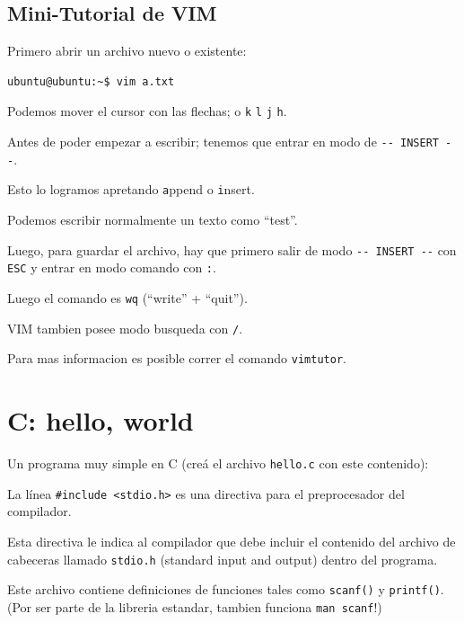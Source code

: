 \documentclass[11pt,a4paper]{article}
\newcommand{\inputcode}[2][]{%
  \par\noindent\begin{minipage}{\linewidth}
    
  \end{minipage}\par}
\begin{document}
\subsection{Mini-Tutorial de VIM}

Primero abrir un archivo nuevo o existente:

\begin{lstlisting}[language=bash]
ubuntu@ubuntu:~$ vim a.txt
\end{lstlisting}

Podemos mover el cursor con las flechas; o \lstinline!k! \lstinline!l! \lstinline!j! \lstinline!h!.

Antes de poder empezar a escribir; tenemos que entrar en modo de \lstinline!-- INSERT --!.

Esto lo logramos apretando \lstinline!a!ppend o \lstinline!i!nsert.

Podemos escribir normalmente un texto como ``test''.

Luego, para guardar el archivo, hay que primero salir de modo \lstinline!-- INSERT --! con \lstinline!ESC! y entrar en modo comando con \lstinline!:!.

Luego el comando es \lstinline!wq! (``write'' + ``quit'').

VIM tambien posee modo busqueda con \lstinline!/!.

\begin{infobox}
Para mas informacion es posible correr el comando \lstinline!vimtutor!.
\end{infobox}

\section{C: hello, world}

Un programa muy simple en C (creá el archivo \lstinline!hello.c! con este contenido):

\inputcode[language=C]{../examples/tp1/hello/hello.c}

La línea \lstinline!#include <stdio.h>! es una directiva para el preprocesador del compilador.

Esta directiva le indica al compilador que debe incluir el contenido del archivo de cabeceras llamado \lstinline!stdio.h! (standard input and output) dentro del programa.

Este archivo contiene definiciones de funciones tales como \lstinline!scanf()! y \lstinline!printf()!. (Por ser parte de la libreria estandar, tambien funciona \lstinline!man scanf!!)
\end{document}
